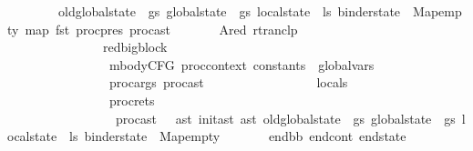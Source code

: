 \begin{isabellebody}
\ \ \ \ \ \ \ \ {\isasymlparr}old{\isacharunderscore}{\kern0pt}global{\isacharunderscore}{\kern0pt}state\ {\isacharequal}{\kern0pt}\ gs{\isacharcomma}{\kern0pt}\ global{\isacharunderscore}{\kern0pt}state\ {\isacharequal}{\kern0pt}\ gs{\isacharcomma}{\kern0pt}\ local{\isacharunderscore}{\kern0pt}state\ {\isacharequal}{\kern0pt}\ ls{\isacharcomma}{\kern0pt}\ binder{\isacharunderscore}{\kern0pt}state\ {\isacharequal}{\kern0pt}\ Map{\isachardot}{\kern0pt}empty{\isasymrparr}\ {\isacharparenleft}{\kern0pt}map\ fst\ {\isacharparenleft}{\kern0pt}proc{\isacharunderscore}{\kern0pt}pres\ proc{\isacharunderscore}{\kern0pt}ast{\isacharparenright}{\kern0pt}{\isacharparenright}{\kern0pt}{\isachardoublequoteclose}\ \isanewline
\ \ \ \ \ \ Ared{\isacharcolon}{\kern0pt}\ {\isachardoublequoteopen}rtranclp\ \isanewline
\ \ \ \ \ \ \ \ \ \ \ \ \ \ \ {\isacharparenleft}{\kern0pt}red{\isacharunderscore}{\kern0pt}bigblock\ \isanewline
\ \ \ \ \ \ \ \ \ \ \ \ \ \ \ \ {\isacharparenleft}{\kern0pt}{\isacharbrackleft}{\kern0pt}{\isacharbrackright}{\kern0pt}{\isacharcolon}{\kern0pt}{\isacharcolon}{\kern0pt}mbodyCFG\ proc{\isacharunderscore}{\kern0pt}context{\isacharparenright}{\kern0pt}\ {\isacharparenleft}{\kern0pt}constants\ {\isacharat}{\kern0pt}\ global{\isacharunderscore}{\kern0pt}vars{\isacharcomma}{\kern0pt}\isanewline
\ \ \ \ \ \ \ \ \ \ \ \ \ \ \ \ proc{\isacharunderscore}{\kern0pt}args\ proc{\isacharunderscore}{\kern0pt}ast\ {\isacharat}{\kern0pt}\isanewline
\ \ \ \ \ \ \ \ \ \ \ \ \ \ \ \ locals\ {\isacharat}{\kern0pt}\isanewline
\ \ \ \ \ \ \ \ \ \ \ \ \ \ \ \ proc{\isacharunderscore}{\kern0pt}rets\isanewline
\ \ \ \ \ \ \ \ \ \ \ \ \ \ \ \ \ proc{\isacharunderscore}{\kern0pt}ast{\isacharparenright}{\kern0pt}\ {\isasymGamma}\ {\isasymOmega}\ ast{\isacharparenright}{\kern0pt}\ {\isacharparenleft}{\kern0pt}init{\isacharunderscore}{\kern0pt}ast\ ast\ {\isasymlparr}old{\isacharunderscore}{\kern0pt}global{\isacharunderscore}{\kern0pt}state\ {\isacharequal}{\kern0pt}\ gs{\isacharcomma}{\kern0pt}\ global{\isacharunderscore}{\kern0pt}state\ {\isacharequal}{\kern0pt}\ gs{\isacharcomma}{\kern0pt}\ local{\isacharunderscore}{\kern0pt}state\ {\isacharequal}{\kern0pt}\ ls{\isacharcomma}{\kern0pt}\ binder{\isacharunderscore}{\kern0pt}state\ {\isacharequal}{\kern0pt}\ Map{\isachardot}{\kern0pt}empty{\isasymrparr}{\isacharparenright}{\kern0pt}\isanewline
\ \ \ \ \ \ \ {\isacharparenleft}{\kern0pt}end{\isacharunderscore}{\kern0pt}bb{\isacharcomma}{\kern0pt}\ end{\isacharunderscore}{\kern0pt}cont{\isacharcomma}{\kern0pt}\ end{\isacharunderscore}{\kern0pt}state{\isacharparenright}{\kern0pt}{\isachardoublequoteclose}\isanewline

\end{isabellebody}
